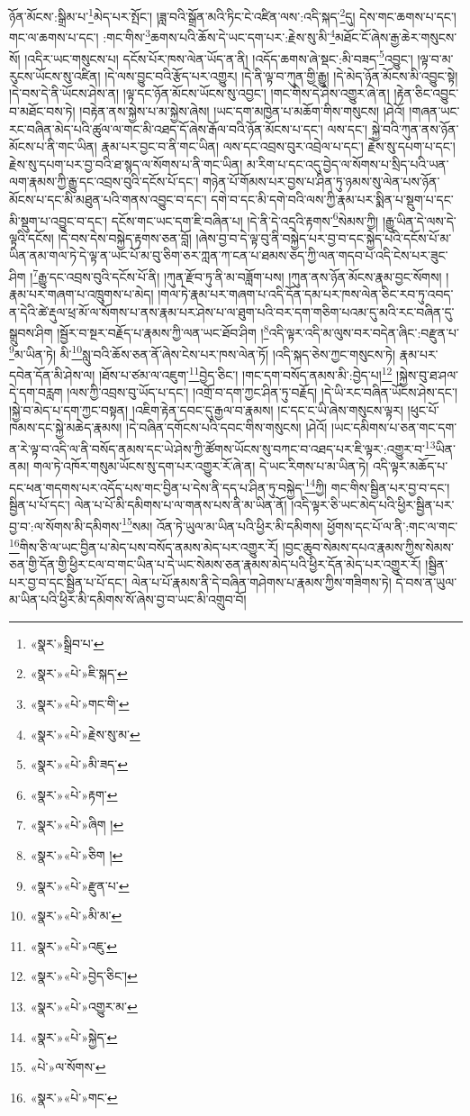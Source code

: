 ཉོན་མོངས་:སྒྲིམ་པ་\footnote{«སྣར་»སྒྲིབ་པ་}མེད་པར་སྤོང་། །ཟླ་བའི་སྒྲོན་མའི་ཏིང་ངེ་འཛིན་ལས་:འདི་སྐད་\footnote{«སྣར་»«པེ་»ཇི་སྐད་}དུ། དེས་གང་ཆགས་པ་དང་། གང་ལ་ཆགས་པ་དང་། :གང་གིས་\footnote{«སྣར་»«པེ་»གང་གི་}ཆགས་པའི་ཆོས་དེ་ཡང་དག་པར་:རྗེས་སུ་མི་\footnote{«སྣར་»«པེ་»རྗེས་སུ་མ་}མཐོང་ངོ་ཞེས་རྒྱ་ཆེར་གསུངས་སོ། །འདིར་ཡང་གསུངས་པ། དངོས་པོར་ཁས་ལེན་ཡོད་ན་ནི། །འདོད་ཆགས་ཞེ་སྡང་:མི་བཟད་\footnote{«སྣར་»«པེ་»མི་ཟད་}འབྱུང་། །ལྟ་བ་མ་རུངས་ཡོངས་སུ་འཛིན། །དེ་ལས་བྱུང་བའི་རྩོད་པར་འགྱུར། །དེ་ནི་ལྟ་བ་ཀུན་གྱི་རྒྱུ། །དེ་མེད་ཉོན་མོངས་མི་འབྱུང་སྟེ། །དེ་བས་དེ་ནི་ཡོངས་ཤེས་ན། །ལྟ་དང་ཉོན་མོངས་ཡོངས་སུ་འབྱང་། །གང་གིས་དེ་ཤེས་འགྱུར་ཞེ་ན། །རྟེན་ཅིང་འབྱུང་བ་མཐོང་བས་ཏེ། །བརྟེན་ནས་སྐྱེས་པ་མ་སྐྱེས་ཞེས། །ཡང་དག་མཁྱེན་པ་མཆོག་གིས་གསུངས། །ཤེའོ། །གཞན་ཡང་རང་བཞིན་མེད་པའི་ཚུལ་ལ་གང་མི་འཐད་དོ་ཞེས་རྒོལ་བའི་ཉོན་མོངས་པ་དང་། ལས་དང་། སྐྱེ་བའི་ཀུན་ནས་ཉོན་མོངས་པ་ནི་གང་ཡིན། རྣམ་པར་བྱང་བ་ནི་གང་ཡིན། ལས་དང་འབྲས་བུར་འབྲེལ་པ་དང་། རྗེས་སུ་དཔག་པ་དང་། རྗེས་སུ་དཔག་པར་བྱ་བའི་ཐ་སྙད་ལ་སོགས་པ་ནི་གང་ཡིན། མ་རིག་པ་དང་འདུ་བྱེད་ལ་སོགས་པ་སྲིད་པའི་ཡན་ལག་རྣམས་ཀྱི་རྒྱུ་དང་འབྲས་བུའི་དངོས་པོ་དང་། གཉེན་པོ་གོམས་པར་བྱས་པ་ཤིན་ཏུ་ཉམས་སུ་ལེན་པས་ཉོན་མོངས་པ་དང་མི་མཐུན་པའི་གནས་འབྱུང་བ་དང་། དགེ་བ་དང་མི་དགེ་བའི་ལས་ཀྱི་རྣམ་པར་སྨིན་པ་སྡུག་པ་དང་མི་སྡུག་པ་འབྱུང་བ་དང་། དངོས་གང་ཡང་དག་ཇི་བཞིན་པ། །དེ་ནི་དེ་འདྲའི་རྟགས་\footnote{«སྣར་»«པེ་»རྟག་}སེམས་ཀྱི། །རྒྱུ་ཡིན་དེ་ལས་དེ་ལྟའི་དངོས། །དེ་བས་དེས་བསྐྱེད་རྟགས་ཅན་བློ། །ཞེས་བྱ་བ་དེ་ལྟ་བུ་ནི་བསྐྱེད་པར་བྱ་བ་དང་སྐྱེད་པའི་དངོས་པོ་མ་ཡིན་ནམ་གལ་ཏེ་དེ་ལྟ་ན་ཡང་པོ་མ་བུ་ཅིག་ཅར་ཀླན་ཀ་ངན་པ་ཐམས་ཅད་ཀྱི་ལན་གདབ་པ་འདི་ངེས་པར་ཟུང་ཤིག །\footnote{«སྣར་»«པེ་»ཞིག །}རྒྱུ་དང་འབྲས་བུའི་དངོས་པོ་ནི། །ཀུན་རྫོབ་ཏུ་ནི་མ་བཟློག་པས། །ཀུན་ནས་ཉོན་མོངས་རྣམ་བྱང་སོགས། །རྣམ་པར་གཞག་པ་འཁྲུགས་པ་མེད། །གལ་ཏེ་རྣམ་པར་གཞག་པ་འདི་དོན་དམ་པར་ཁས་ལེན་ཅིང་རབ་ཏུ་འབད་ན་དེའི་ཚེ་རྡུལ་ཕྲ་མོ་ལ་སོགས་པ་ནས་རྣམ་པར་ཤེས་པ་ལ་ཐུག་པའི་བར་དག་གཅིག་པའམ་དུ་མའི་རང་བཞིན་དུ་སྒྲུབས་ཤིག །སྦྱོར་བ་སྔར་བརྗོད་པ་རྣམས་ཀྱི་ལན་ཡང་ཐོབ་ཤིག །\footnote{«སྣར་»«པེ་»ཅིག །}འདི་ལྟར་འདི་མ་ལུས་བར་བདེན་ཞིང་:བརྫུན་པ་\footnote{«སྣར་»«པེ་»རྫུན་པ་}མ་ཡིན་ཏེ། མི་\footnote{«སྣར་»«པེ་»མི་མ་}སླུ་བའི་ཆོས་ཅན་ནོ་ཞེས་ངེས་པར་ཁས་ལེན་ཏོ། །འདི་སྐད་ཅེས་ཀྱང་གསུངས་ཏེ། རྣམ་པར་དབེན་དོན་མི་ཤེས་ལ། །ཐོས་པ་ཙམ་ལ་འཇུག་\footnote{«སྣར་»«པེ་»འཇུ་}བྱེད་ཅིང་། །གང་དག་བསོད་ནམས་མི་:བྱེད་པ།\footnote{«སྣར་»«པེ་»བྱེད་ཅིང་།} །སྐྱེས་བུ་ཐ་ཤལ་དེ་དག་བརླག །ལས་ཀྱི་འབྲས་བུ་ཡོད་པ་དང་། །འགྲོ་བ་དག་ཀྱང་ཤིན་ཏུ་བརྗོད། །དེ་ཡི་རང་བཞིན་ཡོངས་ཤེས་དང་། །སྐྱེ་བ་མེད་པ་དག་ཀྱང་བསྟན། །འཇིག་རྟེན་དབང་དུ་རྒྱལ་བ་རྣམས། །ང་དང་ང་ཡི་ཞེས་གསུངས་ལྟར། །ཕུང་པོ་ཁམས་དང་སྐྱེ་མཆེད་རྣམས། །དེ་བཞིན་དགོངས་པའི་དབང་གིས་གསུངས། །ཤེའོ། །ཡང་དམིགས་པ་ཅན་གང་དག་ན་རེ་ལྟ་བ་འདི་ལ་ནི་བསོད་ནམས་དང་ཡེ་ཤེས་ཀྱི་ཚོགས་ཡོངས་སུ་བཀང་བ་འཐད་པར་ཇི་ལྟར་:འགྱུར་བ་\footnote{«སྣར་»«པེ་»འགྱུར་མ་}ཡིན་ནམ། གལ་ཏེ་འཁོར་གསུམ་ཡོངས་སུ་དག་པར་འགྱུར་རོ་ཞེ་ན། དེ་ཡང་རིགས་པ་མ་ཡིན་ཏེ། འདི་ལྟར་མཆོད་པ་དང་ཕན་གདགས་པར་འདོད་པས་གང་བྱིན་པ་དེས་ནི་དད་པ་ཤིན་ཏུ་བསྐྱེད་\footnote{«སྣར་»«པེ་»སྐྱེད་}ཀྱི། གང་གིས་སྦྱིན་པར་བྱ་བ་དང་། སྦྱིན་པ་པོ་དང་། ལེན་པ་པོ་མི་དམིགས་པ་ལ་གནས་པས་ནི་མ་ཡིན་ནོ། །འདི་ལྟར་ཅི་ཡང་མེད་པའི་ཕྱིར་སྦྱིན་པར་བྱ་བ་:ལ་སོགས་མི་དམིགས་\footnote{«པེ་»ལ་སོགས་}སམ། འོན་ཏེ་ཡུལ་མ་ཡིན་པའི་ཕྱིར་མི་དམིགས། ཕྱོགས་དང་པོ་ལ་ནི་:གང་ལ་གང་\footnote{«སྣར་»«པེ་»གང་}གིས་ཅི་ལ་ཡང་བྱིན་པ་མེད་པས་བསོད་ནམས་མེད་པར་འགྱུར་རོ། །བྱང་ཆུབ་སེམས་དཔའ་རྣམས་ཀྱིས་སེམས་ཅན་གྱི་དོན་གྱི་ཕྱིར་ངལ་བ་གང་ཡིན་པ་དེ་ཡང་སེམས་ཅན་རྣམས་མེད་པའི་ཕྱིར་དོན་མེད་པར་འགྱུར་རོ། །སྦྱིན་པར་བྱ་བ་དང་སྦྱིན་པ་པོ་དང་། ལེན་པ་པོ་རྣམས་ནི་དེ་བཞིན་གཤེགས་པ་རྣམས་ཀྱིས་གཟིགས་ཏེ། དེ་བས་ན་ཡུལ་མ་ཡིན་པའི་ཕྱིར་མི་དམིགས་སོ་ཞེས་བྱ་བ་ཡང་མི་འགྲུབ་བོ། 